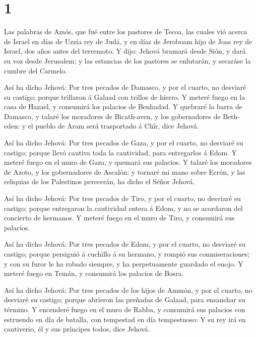 \hypertarget{section}{%
\section{1}\label{section}}

 Las palabras de Amós, que fué entre los pastores de Tecoa,
las cuales vió acerca de Israel en días de Uzzía rey de Judá, y en días
de Jeroboam hijo de Joas rey de Israel, dos años antes del terremoto.
 Y dijo: Jehová bramará desde Sión, y dará su voz desde
Jerusalem; y las estancias de los pastores se enlutarán, y secaráse la
cumbre del Carmelo.

 Así ha dicho Jehová: Por tres pecados de Damasco, y por el
cuarto, no desviaré su castigo; porque trillaron á Galaad con trillos de
hierro.  Y meteré fuego en la casa de Hazael, y consumirá
los palacios de Benhadad.  Y quebraré la barra de Damasco, y
talaré los moradores de Bicath-aven, y los gobernadores de Beth-eden: y
el pueblo de Aram será trasportado á Chîr, dice Jehová.

 Así ha dicho Jehová: Por tres pecados de Gaza, y por el
cuarto, no desviaré su castigo; porque llevó cautiva toda la cautividad,
para entregarlos á Edom.  Y meteré fuego en el muro de Gaza,
y quemará sus palacios.  Y talaré los moradores de Azoto, y
los gobernadores de Ascalón: y tornaré mi mano sobre Ecrón, y las
reliquias de los Palestinos perecerán, ha dicho el Señor Jehová.

 Así ha dicho Jehová: Por tres pecados de Tiro, y por el
cuarto, no desviaré su castigo; porque entregaron la cautividad entera á
Edom, y no se acordaron del concierto de hermanos.  Y
meteré fuego en el muro de Tiro, y consumirá sus palacios.

 Así ha dicho Jehová: Por tres pecados de Edom, y por el
cuarto, no desviaré su castigo; porque persiguió á cuchillo á su
hermano, y rompió sus conmiseraciones; y con su furor le ha robado
siempre, y ha perpetuamente guardado el enojo.  Y meteré
fuego en Temán, y consumirá los palacios de Bosra.

 Así ha dicho Jehová: Por tres pecados de los hijos de
Ammón, y por el cuarto, no desviaré su castigo; porque abrieron las
preñadas de Galaad, para ensanchar su término.  Y encenderé
fuego en el muro de Rabba, y consumirá sus palacios con estruendo en día
de batalla, con tempestad en día tempestuoso:  Y su rey irá
en cautiverio, él y sus príncipes todos, dice Jehová.

